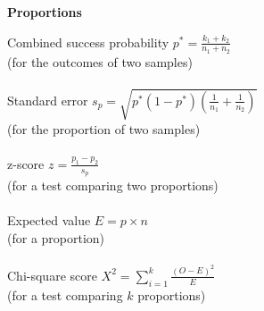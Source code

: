 \begin{minipage}[t]{.45\textwidth}
\begin{center}
    \textbf{Proportions}
\end{center}
\hline
\answerskip
Combined success probability \hfill $p^* = \frac{k_1 + k_2}{n_1 + n_2}$ \\
{\scriptsize (for the outcomes of two samples)} \\
\\
Standard error \hfill $s_p = \sqrt{p^*(1 - p^*) (\frac{1}{n_1} + \frac{1}{n_2})}$ \\
{\scriptsize (for the proportion of two samples)} \\
\\
z-score \hfill $z = \frac{p_1 - p_2}{s_p}$ \\
{\scriptsize (for a test comparing two proportions)} \\
\\
Expected value \hfill $E = p \times n$ \\
{\scriptsize (for a proportion)} \\
\\
Chi-square score \hfill $X^2 = \sum_{i=1}^k \frac{(O - E)^2}{E}$ \\
{\scriptsize (for a test comparing $k$ proportions)} \\
\\
\end{minipage}

\clearpage %